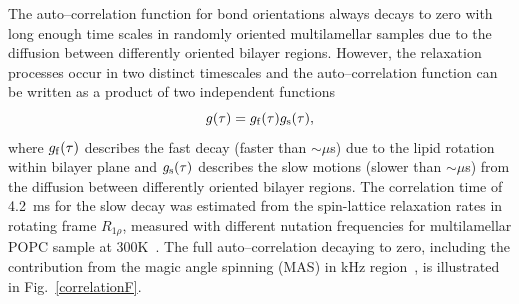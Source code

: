 \documentclass[aps,prl,superscriptaddress,twocolumn]{revtex4}
\begin{document}
The auto--correlation function for bond orientations always decays to zero
with long enough time scales in randomly oriented multilamellar samples due to the
diffusion between differently oriented bilayer regions. 
However, the relaxation processes occur in two distinct timescales and the auto--correlation function
can be written as a product of two independent functions~\cite{halle81,ferreira15}
\begin{equation}\label{corrF}
g(\tau)=g_{\rm{f}}(\tau) g_{\rm{s}}(\tau),
\end{equation}
where $g_{\rm{f}}(\tau)$ describes the fast decay (faster than $\sim \mu$s) due  
to the lipid rotation within bilayer plane and $g_{\rm{s}}(\tau)$ describes the slow motions (slower than $\sim \mu$s)
from the diffusion between differently oriented bilayer regions.
The correlation time of 4.2~ms for the slow decay was estimated from the spin-lattice relaxation rates in 
rotating frame $R_{1\rho}$, measured with different nutation frequencies for multilamellar POPC sample at 300K~\cite{ferreira15}.
The full auto--correlation decaying to zero, including the contribution from the magic angle spinning (MAS) in kHz region~\cite{nowacka10},
is illustrated in Fig.~\ref{correlationF}. 
\end{document}
